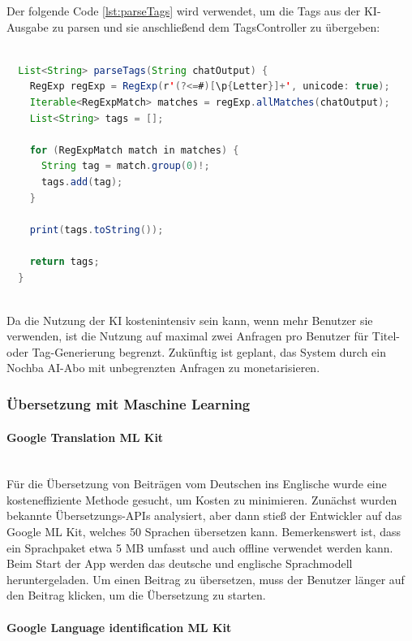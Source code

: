 Der folgende Code \ref{lst:parseTags} wird verwendet, um die Tags aus der KI-Ausgabe zu parsen und sie anschließend dem TagsController zu übergeben:

\begin{lstlisting}[language=Java,caption=parseTags von 
  KI output,label=lst:parseTags]  
  
  List<String> parseTags(String chatOutput) {
    RegExp regExp = RegExp(r'(?<=#)[\p{Letter}]+', unicode: true);
    Iterable<RegExpMatch> matches = regExp.allMatches(chatOutput);
    List<String> tags = [];

    for (RegExpMatch match in matches) {
      String tag = match.group(0)!;
      tags.add(tag);
    }

    print(tags.toString());

    return tags;
  }
    
\end{lstlisting}


Da die Nutzung der KI kostenintensiv sein kann, wenn mehr Benutzer sie verwenden, ist die Nutzung auf maximal zwei Anfragen pro Benutzer für Titel- oder Tag-Generierung begrenzt. Zukünftig ist geplant, das System durch ein Nochba AI-Abo mit unbegrenzten Anfragen zu monetarisieren.

\subsubsection{Übersetzung mit Maschine Learning}

\paragraph{Google Translation ML Kit}\mbox{} \\

Für die Übersetzung von Beiträgen vom Deutschen ins Englische wurde eine kosteneffiziente Methode gesucht, um Kosten zu minimieren. Zunächst wurden bekannte Übersetzungs-APIs analysiert, aber dann stieß der Entwickler auf das Google ML Kit, welches 50 Sprachen übersetzen kann. Bemerkenswert ist, dass ein Sprachpaket etwa 5 MB umfasst und auch offline verwendet werden kann. Beim Start der App werden das deutsche und englische Sprachmodell heruntergeladen. Um einen Beitrag zu übersetzen, muss der Benutzer länger auf den Beitrag klicken, um die Übersetzung zu starten.



\paragraph{Google Language identification ML Kit}\mbox{} \\

